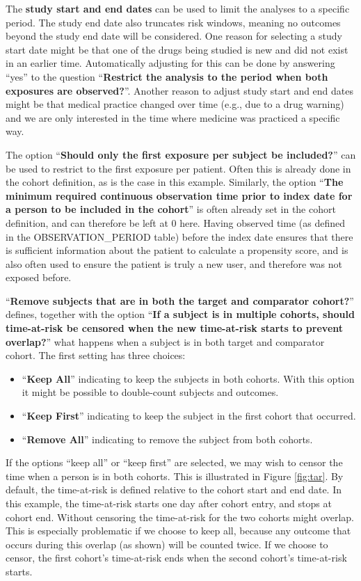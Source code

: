\documentclass[11pt]{book}
\providecommand{\tightlist}{%
  \setlength{\itemsep}{0pt}\setlength{\parskip}{0pt}}
\begin{document}
The \textbf{study start and end dates} can be used to limit the analyses
to a specific period. The study end date also truncates risk windows,
meaning no outcomes beyond the study end date will be considered. One
reason for selecting a study start date might be that one of the drugs
being studied is new and did not exist in an earlier time. Automatically
adjusting for this can be done by answering ``yes'' to the question
``\textbf{Restrict the analysis to the period when both exposures are
observed?}''. Another reason to adjust study start and end dates might
be that medical practice changed over time (e.g., due to a drug warning)
and we are only interested in the time where medicine was practiced a
specific way.

The option ``\textbf{Should only the first exposure per subject be
included?}'' can be used to restrict to the first exposure per patient.
Often this is already done in the cohort definition, as is the case in
this example. Similarly, the option ``\textbf{The minimum required
continuous observation time prior to index date for a person to be
included in the cohort}'' is often already set in the cohort definition,
and can therefore be left at 0 here. Having observed time (as defined in
the OBSERVATION\_PERIOD table) before the index date ensures that there
is sufficient information about the patient to calculate a propensity
score, and is also often used to ensure the patient is truly a new user,
and therefore was not exposed before.

``\textbf{Remove subjects that are in both the target and comparator
cohort?}'' defines, together with the option ``\textbf{If a subject is
in multiple cohorts, should time-at-risk be censored when the new
time-at-risk starts to prevent overlap?}'' what happens when a subject
is in both target and comparator cohort. The first setting has three
choices:

\begin{itemize}
\tightlist
\item
  ``\textbf{Keep All}'' indicating to keep the subjects in both cohorts.
  With this option it might be possible to double-count subjects and
  outcomes.
\item
  ``\textbf{Keep First}'' indicating to keep the subject in the first
  cohort that occurred.
\item
  ``\textbf{Remove All}'' indicating to remove the subject from both
  cohorts.
\end{itemize}

If the options ``keep all'' or ``keep first'' are selected, we may wish
to censor the time when a person is in both cohorts. This is illustrated
in Figure \ref{fig:tar}. By default, the time-at-risk is defined
relative to the cohort start and end date. In this example, the
time-at-risk starts one day after cohort entry, and stops at cohort end.
Without censoring the time-at-risk for the two cohorts might overlap.
This is especially problematic if we choose to keep all, because any
outcome that occurs during this overlap (as shown) will be counted
twice. If we choose to censor, the first cohort's time-at-risk ends when
the second cohort's time-at-risk starts.
\end{document}
